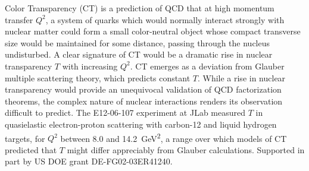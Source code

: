 \noindent
Color Transparency (CT) is a prediction of QCD that at high momentum transfer
$Q ^2$, a system of quarks which would normally interact strongly with nuclear
matter could form a small color-neutral object whose compact transverse size
would be maintained for some distance, passing through the nucleus undisturbed.
A clear signature of CT would be a dramatic rise in nuclear transparency $T$
with increasing $Q^2$.
CT emerges as a deviation from Glauber multiple scattering
theory, which predicts constant $T$.
While a rise in nuclear transparency would provide an unequivocal validation of
QCD factorization theorems, the complex nature of nuclear
interactions renders its observation difficult to predict.
The E12-06-107 experiment at JLab measured $T$ in quasielastic electron-proton
scattering with carbon-12 and liquid hydrogen targets, for $Q^2$ between 8.0
and \SI{14.2}{\giga\electronvolt\squared}, a range over which models of CT
predicted that $T$ might differ appreciably from Glauber calculations.
Supported in part by US DOE grant DE-FG02-03ER41240.
